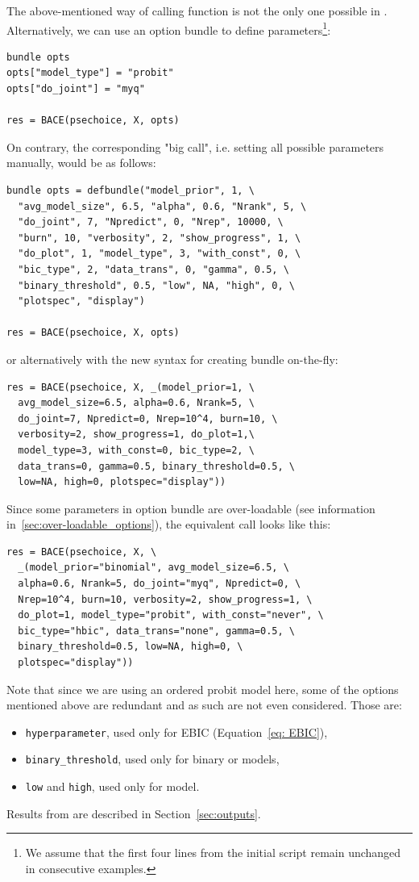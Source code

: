 The above-mentioned way of calling  function
is not the only one possible in . 
Alternatively, we can use an option bundle to define
 parameters\footnote{We assume that the first four
	lines from the initial script remain unchanged in
	consecutive examples.}:
\begin{lstlisting}
bundle opts
opts["model_type"] = "probit"
opts["do_joint"] = "myq"

res = BACE(psechoice, X, opts)
\end{lstlisting}
On contrary, the corresponding "big call", i.e. setting
all possible parameters manually, would be as follows:
\begin{lstlisting}
bundle opts = defbundle("model_prior", 1, \
  "avg_model_size", 6.5, "alpha", 0.6, "Nrank", 5, \
  "do_joint", 7, "Npredict", 0, "Nrep", 10000, \
  "burn", 10, "verbosity", 2, "show_progress", 1, \
  "do_plot", 1, "model_type", 3, "with_const", 0, \
  "bic_type", 2, "data_trans", 0, "gamma", 0.5, \
  "binary_threshold", 0.5, "low", NA, "high", 0, \
  "plotspec", "display")

res = BACE(psechoice, X, opts)
\end{lstlisting}
or alternatively with the new syntax for creating bundle
on-the-fly:
\begin{lstlisting}
res = BACE(psechoice, X, _(model_prior=1, \
  avg_model_size=6.5, alpha=0.6, Nrank=5, \
  do_joint=7, Npredict=0, Nrep=10^4, burn=10, \
  verbosity=2, show_progress=1, do_plot=1,\
  model_type=3, with_const=0, bic_type=2, \
  data_trans=0, gamma=0.5, binary_threshold=0.5, \
  low=NA, high=0, plotspec="display"))
\end{lstlisting}
Since some parameters in option bundle are over-loadable
(see information in~\ref{sec:over-loadable_options}),
the equivalent call looks like this:
\begin{lstlisting}
res = BACE(psechoice, X, \
  _(model_prior="binomial", avg_model_size=6.5, \
  alpha=0.6, Nrank=5, do_joint="myq", Npredict=0, \
  Nrep=10^4, burn=10, verbosity=2, show_progress=1, \
  do_plot=1, model_type="probit", with_const="never", \
  bic_type="hbic", data_trans="none", gamma=0.5, \
  binary_threshold=0.5, low=NA, high=0, \
  plotspec="display"))
\end{lstlisting}
Note that since we are using an ordered probit model here,
some of the options mentioned above are redundant and as
such are not even considered. Those are:
\begin{itemize}
	\item \texttt{hyperparameter}, used only for EBIC
		(Equation~\ref{eq: EBIC}),
	\item \texttt{binary\_threshold}, used only for
		binary \gretlcmd{logit} or \gretlcmd{probit} models,
	\item \texttt{low} and \texttt{high}, used only
		for \gretlcmd{tobit} model.
\end{itemize}
Results from \pkg{BACE} are described in Section~\ref{sec:outputs}.

